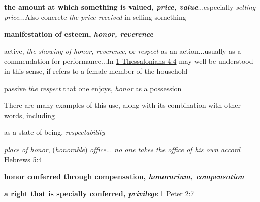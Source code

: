 				\begin{compactdesc}
				
					\item[BDAG 893b] \textbf{}
						\begin{compactitem}
							\item[1] \textbf{the amount at which something is valued, \textit{price, value}}...especially \textit{selling price}...Also concrete \textit{the price received} in selling something
							\item[2] \textbf{manifestation of esteem, \textit{honor, reverence}}
							\item[2.a] active, \textit{the showing of honor, reverence}, or \textit{respect} as an action...usually as a commendation for performance...In \hyperref[1THESSALONIANS-4-4]{1 Thessalonians 4:4}  may well be understood in this sense, if  refers to a female member of the household
							\item[2.b] passive \textit{the respect} that one enjoys, \textit{honor} as a possession
								\begin{compactitem}
									\item There are many examples of this use, along with its combination with other words, including 
								\end{compactitem}
							\item[2.c] as a state of being, \textit{respectability}
							\item[2.d] \textit{place of honor}, (\textit{honorable}) \textit{office}... \textit{no one takes the office of his own accord} \hyperref[HEBREWS-5-4]{Hebrews 5:4}
							\item[3] \textbf{honor conferred through compensation, \textit{honorarium, compensation}}
							\item[4] \textbf{a right that is specially conferred, \textit{privilege}} \hyperref[1PETER-2-7]{1 Peter 2:7}
						\end{compactitem}
						

\end{compactdesc}
